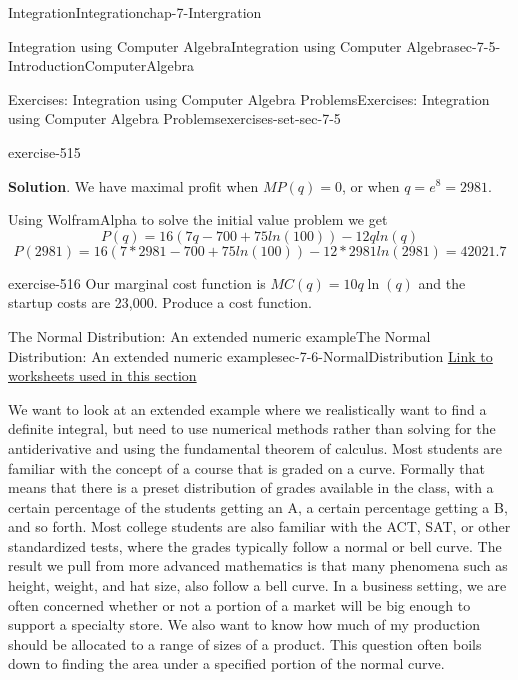\documentclass[oneside,10pt,]{book}
\numberwithin{equation}{section}
\begin{document}
\begin{chapterptx}{Integration}{}{Integration}{}{}{chap-7-Intergration}
\begin{sectionptx}{Integration using Computer Algebra}{}{Integration using Computer Algebra}{}{}{sec-7-5-IntroductionComputerAlgebra}
\begin{exercises-subsection-numberless}{Exercises: Integration using Computer Algebra Problems}{}{Exercises: Integration using Computer Algebra Problems}{}{}{exercises-set-sec-7-5}
\begin{divisionexercise}{23}{}{}{exercise-515}
\par\smallskip%
\noindent\textbf{Solution}.\hypertarget{solution-261}{}\quad%
\hypertarget{p-2923}{}%
We have maximal profit when \(MP(q)=0\), or when \(q=e^8=2981\).%
\par
\hypertarget{p-2924}{}%
Using WolframAlpha to solve the initial value problem we get%
%
\begin{equation*}
P(q)=16(7q-700+75ln(100))-12q ln(q)
\end{equation*}
%
\begin{equation*}
P(2981)= 16(7*2981-700+75ln(100))-12*2981 ln(2981)=42021.7
\end{equation*}
\end{divisionexercise}%
\begin{divisionexercise}{24}{}{}{exercise-516}%
\hypertarget{p-2925}{}%
Our marginal cost function is \(MC(q)=10q \ln(q)\) and the startup costs are \textdollar{}23,000.  Produce a cost function.%
\end{divisionexercise}%
\end{exercises-subsection-numberless}
\end{sectionptx}
%
%
\typeout{************************************************}
\typeout{************************************************}
%
\begin{sectionptx}{The Normal Distribution: An extended numeric example}{}{The Normal Distribution: An extended numeric example}{}{}{sec-7-6-NormalDistribution}
\hypertarget{p-2926}{}%
\href{./Examples/Section-7-6-Examples.xlsx}{Link to worksheets used in this section}%
\par
\hypertarget{p-2927}{}%
We want to look at an extended example where we realistically want to find a definite integral, but need to use numerical methods rather than solving for the antiderivative and using the fundamental theorem of calculus. Most students are familiar with the concept of a course that is graded on a curve.  Formally that means that there is a preset distribution of grades available in the class, with a certain percentage of the students getting an A, a certain percentage getting a B, and so forth.  Most college students are also familiar with the ACT, SAT, or other standardized tests, where the grades typically follow a normal or bell curve.  The result we pull from more advanced mathematics is that many phenomena such as height, weight, and hat size, also follow a bell curve.  In a business setting, we are often concerned whether or not a portion of a market will be big enough to support a specialty store.  We also want to know how much of my production should be allocated to a range of sizes of a product.  This question often boils down to finding the area under a specified portion of the normal curve.%

\end{sectionptx}
\end{chapterptx}
\end{document}
